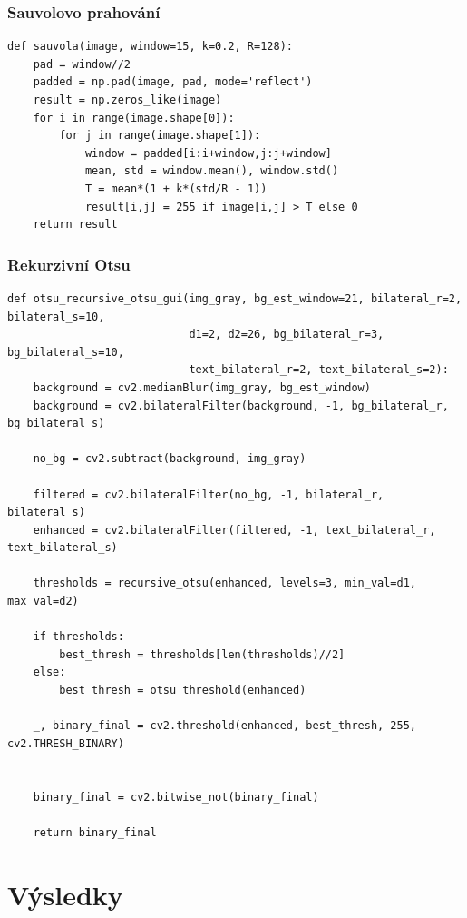 \documentclass[12pt,a4paper]{article}
\begin{document}
\subsubsection{Sauvolovo prahování}
\begin{lstlisting}
def sauvola(image, window=15, k=0.2, R=128):
    pad = window//2
    padded = np.pad(image, pad, mode='reflect')
    result = np.zeros_like(image)
    for i in range(image.shape[0]):
        for j in range(image.shape[1]):
            window = padded[i:i+window,j:j+window]
            mean, std = window.mean(), window.std()
            T = mean*(1 + k*(std/R - 1))
            result[i,j] = 255 if image[i,j] > T else 0
    return result
\end{lstlisting}

\subsubsection{Rekurzivní Otsu}
\begin{lstlisting}
def otsu_recursive_otsu_gui(img_gray, bg_est_window=21, bilateral_r=2, bilateral_s=10,
                            d1=2, d2=26, bg_bilateral_r=3, bg_bilateral_s=10,
                            text_bilateral_r=2, text_bilateral_s=2):
    background = cv2.medianBlur(img_gray, bg_est_window)
    background = cv2.bilateralFilter(background, -1, bg_bilateral_r, bg_bilateral_s)

    no_bg = cv2.subtract(background, img_gray)

    filtered = cv2.bilateralFilter(no_bg, -1, bilateral_r, bilateral_s)
    enhanced = cv2.bilateralFilter(filtered, -1, text_bilateral_r, text_bilateral_s)

    thresholds = recursive_otsu(enhanced, levels=3, min_val=d1, max_val=d2)

    if thresholds:
        best_thresh = thresholds[len(thresholds)//2]
    else:
        best_thresh = otsu_threshold(enhanced)

    _, binary_final = cv2.threshold(enhanced, best_thresh, 255, cv2.THRESH_BINARY)


    binary_final = cv2.bitwise_not(binary_final)

    return binary_final
\end{lstlisting}



\section{Výsledky}
\end{document}
